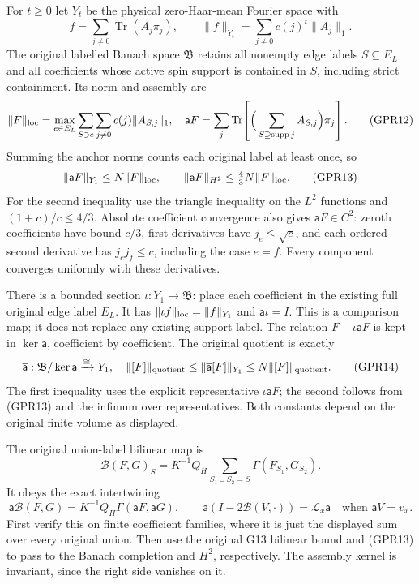 \documentclass[11pt]{article}
\begin{document}
For \(t\ge0\) let \(Y_t\) be the physical zero-Haar-mean Fourier space with
\[
 f=\sum_{j\ne0}\operatorname{Tr}(A_j\pi_j),\qquad
 \|f\|_{Y_t}=\sum_{j\ne0}c(j)^t\|A_j\|_1.
 \tag{GPR11}
\]
The original labelled Banach space \(\mathfrak B\) retains all nonempty edge labels \(S\subseteq E_L\) and all coefficients whose active spin support is contained in \(S\), including strict containment. Its norm and assembly are
\[
 \|F\|_{\rm loc}=\max_{e\in E_L}\sum_{S\ni e}\sum_{j\ne0}c(j)\|A_{S,j}\|_1,
 \quad
 \mathsf aF=\sum_j\operatorname{Tr}\!\left[\Big(\sum_{S\supseteq\operatorname{supp}j}A_{S,j}\Big)\pi_j\right].
 \tag{GPR12}
\]
Summing the anchor norms counts each original label at least once, so
\[
 \|\mathsf aF\|_{Y_1}\le N\|F\|_{\rm loc},\qquad
 \|\mathsf aF\|_{H^2}\le\tfrac43N\|F\|_{\rm loc}.
 \tag{GPR13}
\]
For the second inequality use the triangle inequality on the \(L^2\) functions and \((1+c)/c\le4/3\). Absolute coefficient convergence also gives \(\mathsf aF\in C^2\): zeroth coefficients have bound \(c/3\), first derivatives have \(j_e\le\sqrt c\), and each ordered second derivative has \(j_ej_f\le c\), including the case \(e=f\). Every component converges uniformly with these derivatives.

There is a bounded section \(\iota:Y_1\to\mathfrak B\): place each coefficient in the existing full original edge label \(E_L\). It has \(\|\iota f\|_{\rm loc}=\|f\|_{Y_1}\) and \(\mathsf a\iota=I\). This is a comparison map; it does not replace any existing support label. The relation \(F-\iota\mathsf aF\) is kept in \(\ker\mathsf a\), coefficient by coefficient. The original quotient is exactly
\[
 \overline{\mathsf a}:\mathfrak B/\ker\mathsf a\xrightarrow{\cong}Y_1,
 \quad
 \|[F]\|_{\rm quotient}\le\|\overline{\mathsf a}[F]\|_{Y_1}
 \le N\|[F]\|_{\rm quotient}.
 \tag{GPR14}
\]
The first inequality uses the explicit representative \(\iota\mathsf aF\); the second follows from (GPR13) and the infimum over representatives. Both constants depend on the original finite volume as displayed.

The original union-label bilinear map is
\[
 \mathcal B(F,G)_S=K^{-1}Q_H
       \sum_{S_1\cup S_2=S}\Gamma(F_{S_1},G_{S_2}).
\]
It obeys the exact intertwining
\[
 \mathsf a\mathcal B(F,G)=K^{-1}Q_H\Gamma(\mathsf aF,\mathsf aG),
 \qquad
 \mathsf a(I-2\mathcal B(V,\cdot))
 =\mathscr L_x\mathsf a\quad\text{when }\mathsf aV=v_x.
 \tag{GPR15}
\]
First verify this on finite coefficient families, where it is just the displayed sum over every original union. Then use the original G13 bilinear bound and (GPR13) to pass to the Banach completion and \(H^2\), respectively. The assembly kernel is invariant, since the right side vanishes on it.
\end{document}
